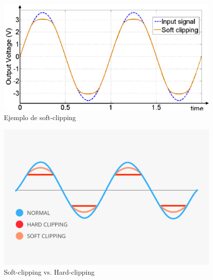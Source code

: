 \documentclass[../../main.tex]{subfiles}
\begin{document}
\begin{enumerate}
\begin{figure}[H]	%
	\centering
	\includegraphics[scale=0.4]{imagenes/soft_clipping_grafico_tipico.png}
	\caption{Ejemplo de soft-clipping}
	\label{fig:ej5_soft_clipping_grafico_tipico}
\end{figure}


\begin{figure}[H]	%
	\centering
	\includegraphics[scale=0.2]{imagenes/hard_clipping_vs_soft_clipping.png}
	\caption{Soft-clipping vs. Hard-clipping}
	\label{fig:ej5_hard_clipping_vs_soft_clipping}
\end{figure}

\end{enumerate}
\end{document}
